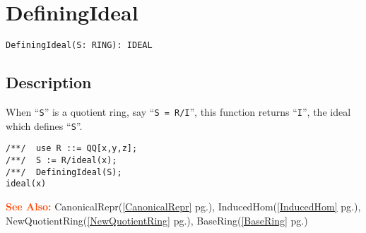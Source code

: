 \documentclass[a4paper]{mybook}
\newenvironment{command}{}{} %
\newcommand\SeeAlso{\par\textcolor{OrangeRed}{\textbf{\large See Also: }}}
\begin{document}
\section{DefiningIdeal}
\label{DefiningIdeal}
\begin{command} %


\begin{Verbatim}[label=syntax, rulecolor=\color{MidnightBlue},
frame=single]
DefiningIdeal(S: RING): IDEAL
\end{Verbatim}


\subsection*{Description}

When ``\verb&S&'' is a quotient ring, say ``\verb&S = R/I&'', this function returns
``\verb&I&'', the ideal which defines ``\verb&S&''.
\begin{Verbatim}[label=example, rulecolor=\color{PineGreen}, frame=single]
/**/  use R ::= QQ[x,y,z];
/**/  S := R/ideal(x);
/**/  DefiningIdeal(S);
ideal(x)
\end{Verbatim}


\SeeAlso %
  CanonicalRepr(\ref{CanonicalRepr} pg.\pageref{CanonicalRepr}), 
    InducedHom(\ref{InducedHom} pg.\pageref{InducedHom}), 
    NewQuotientRing(\ref{NewQuotientRing} pg.\pageref{NewQuotientRing}), 
    BaseRing(\ref{BaseRing} pg.\pageref{BaseRing})
\end{command} %
\end{document}
